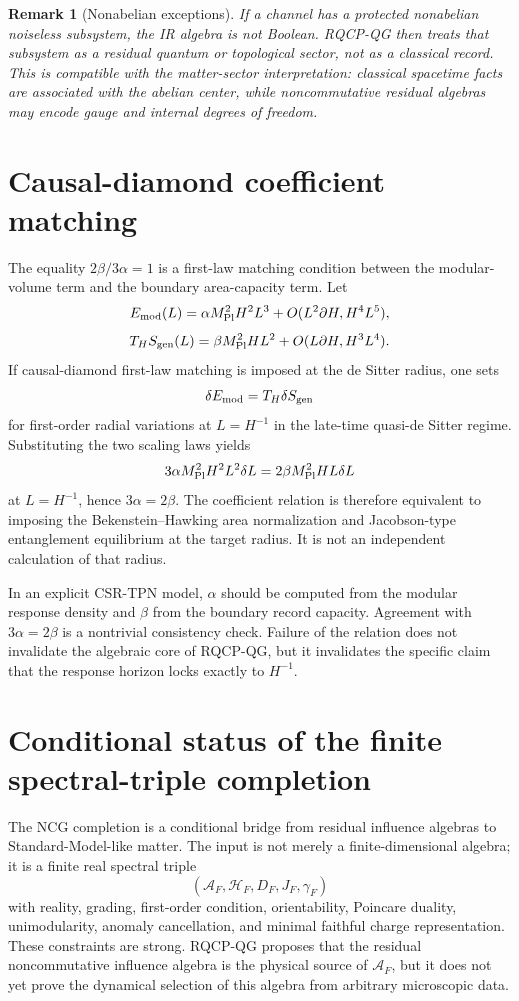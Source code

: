 \documentclass[11pt]{article}
\newtheorem{remark}[theorem]{Remark}
\newcommand{\A}{\mathcal A}
\newcommand{\Hh}{\mathcal H}
\begin{document}
\begin{remark}[Nonabelian exceptions]
If a channel has a protected nonabelian noiseless subsystem, the IR algebra is not Boolean.  RQCP-QG then treats that subsystem as a residual quantum or topological sector, not as a classical record.  This is compatible with the matter-sector interpretation: classical spacetime facts are associated with the abelian center, while noncommutative residual algebras may encode gauge and internal degrees of freedom.
\end{remark}

\section{Causal-diamond coefficient matching}\label{app:v62-coefficients}

The equality $2\beta/3\alpha=1$ is a first-law matching condition between the modular-volume term and the boundary area-capacity term.  Let
\[
E_{\rm mod}(L)=\alpha M_{\rm Pl}^2H^2L^3+O(L^2\partial H,H^4L^5),
\]
\[
T_HS_{\rm gen}(L)=\beta M_{\rm Pl}^2HL^2+O(L\partial H,H^3L^4).
\]
If causal-diamond first-law matching is imposed at the de Sitter radius, one
sets
\[
\delta E_{\rm mod}=T_H\delta S_{\rm gen}
\]
for first-order radial variations at $L=H^{-1}$ in the late-time quasi-de Sitter regime.  Substituting the two scaling laws yields
\[
3\alpha M_{\rm Pl}^2H^2L^2\delta L
=
2\beta M_{\rm Pl}^2HL\delta L
\]
at $L=H^{-1}$, hence $3\alpha=2\beta$.  The coefficient relation is
therefore equivalent to imposing the Bekenstein--Hawking area normalization
and Jacobson-type entanglement equilibrium at the target radius.  It is not
an independent calculation of that radius.

In an explicit CSR-TPN model, $\alpha$ should be computed from the modular response density and $\beta$ from the boundary record capacity.  Agreement with $3\alpha=2\beta$ is a nontrivial consistency check.  Failure of the relation does not invalidate the algebraic core of RQCP-QG, but it invalidates the specific claim that the response horizon locks exactly to $H^{-1}$.

\section{Conditional status of the finite spectral-triple completion}\label{app:v62-ncg-status}

The NCG completion is a conditional bridge from residual influence algebras to Standard-Model-like matter.  The input is not merely a finite-dimensional algebra; it is a finite real spectral triple
\[
(\A_F,\Hh_F,D_F,J_F,\gamma_F)
\]
with reality, grading, first-order condition, orientability, Poincare duality, unimodularity, anomaly cancellation, and minimal faithful charge representation.  These constraints are strong.  RQCP-QG proposes that the residual noncommutative influence algebra is the physical source of $\A_F$, but it does not yet prove the dynamical selection of this algebra from arbitrary microscopic data.
\end{document}
